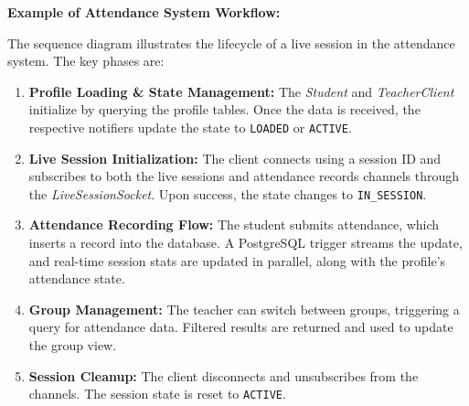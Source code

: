\documentclass[12pt,a4paper]{report}
\begin{document}
\textbf{Example of Attendance System Workflow:}

The sequence diagram illustrates the lifecycle of a live session in the attendance system. The key phases are:

\begin{enumerate}
    \item \textbf{Profile Loading \& State Management:}  
    The \textit{Student} and \textit{TeacherClient} initialize by querying the profile tables. Once the data is received, the respective notifiers update the state to \texttt{LOADED} or \texttt{ACTIVE}.
    
    \item \textbf{Live Session Initialization:}  
    The client connects using a session ID and subscribes to both the live sessions and attendance records channels through the \textit{LiveSessionSocket}. Upon success, the state changes to \texttt{IN\_SESSION}.
    
    \item \textbf{Attendance Recording Flow:}  
    The student submits attendance, which inserts a record into the database. A PostgreSQL trigger streams the update, and real-time session stats are updated in parallel, along with the profile's attendance state.
    
    \item \textbf{Group Management:}  
    The teacher can switch between groups, triggering a query for attendance data. Filtered results are returned and used to update the group view.
    
    \item \textbf{Session Cleanup:}  
    The client disconnects and unsubscribes from the channels. The session state is reset to \texttt{ACTIVE}.
\end{enumerate}
\end{document}
